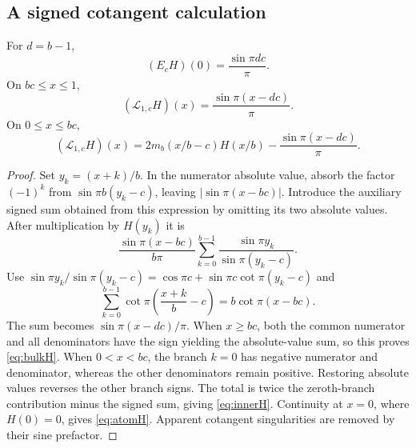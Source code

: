 \documentclass[11pt,a4paper]{article}
\numberwithin{equation}{section}
\theoremstyle{definition}
\theoremstyle{remark}
\newcommand{\Lop}{\mathcal L}
\begin{document}
\subsection{A signed cotangent calculation}
\begin{lemma}
\label{lem:exactH}
For $d=b-1$,
\begin{equation}
 (E_cH)(0)=\frac{\sin\pi dc}{\pi}.
 \label{eq:atomH}
\end{equation}
On $bc\le x\le1$,
\begin{equation}
 (\Lop_{1,c}H)(x)=\frac{\sin\pi(x-dc)}\pi.
 \label{eq:bulkH}
\end{equation}
On $0\le x\le bc$,
\begin{equation}
 (\Lop_{1,c}H)(x)=
 2m_b(x/b-c)H(x/b)-\frac{\sin\pi(x-dc)}\pi.
 \label{eq:innerH}
\end{equation}
\end{lemma}
\begin{proof}
Set $y_k=(x+k)/b$. In the numerator absolute value, absorb the factor
$(-1)^k$ from $\sin\pi b(y_k-c)$, leaving $|\sin\pi(x-bc)|$.
Introduce the auxiliary signed sum obtained from this expression by
omitting its two absolute values. After multiplication by $H(y_k)$ it is
\[
 \frac{\sin\pi(x-bc)}{b\pi}
 \sum_{k=0}^{b-1}\frac{\sin\pi y_k}{\sin\pi(y_k-c)}.
\]
Use
$\sin\pi y_k/\sin\pi(y_k-c)=\cos\pi c+
\sin\pi c\cot\pi(y_k-c)$ and
\[
 \sum_{k=0}^{b-1}\cot\pi\left(\frac{x+k}{b}-c\right)
 =b\cot\pi(x-bc).
\]
The sum becomes $\sin\pi(x-dc)/\pi$. When $x\ge bc$, both the common
numerator and all denominators have the sign yielding the absolute-value
sum, so this proves \cref{eq:bulkH}. When $0<x<bc$, the branch $k=0$
has negative numerator and denominator, whereas the other denominators
remain positive. Restoring absolute values reverses the other branch
signs. The total is twice the zeroth-branch contribution minus the
signed sum, giving \cref{eq:innerH}. Continuity at $x=0$, where
$H(0)=0$, gives \cref{eq:atomH}. Apparent cotangent singularities are
removed by their sine prefactor.
\end{proof}
\end{document}
